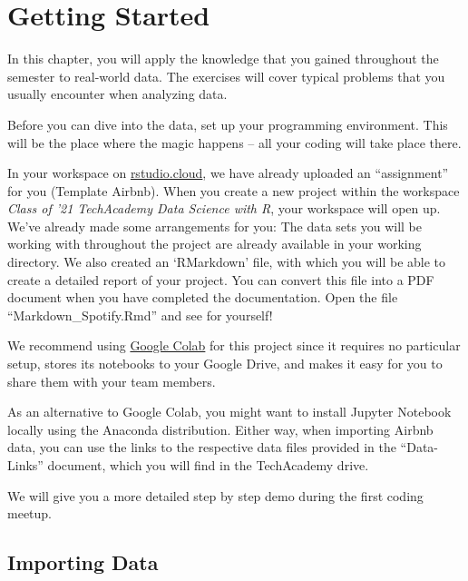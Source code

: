 \documentclass[
  11pt,
]{book}
\newenvironment{tips}[1]
  {
  \begin{itemize}
  \footnotesize
  \renewcommand{\labelitemi}{
    \raisebox{-.7\height}[0pt][0pt]{
      {\setkeys{Gin}{width=3em,keepaspectratio}
        \texttt{[image: images/\#1.png]}}
    }
  }
  \setlength{\fboxsep}{1em}
  \begin{rbox}
  \item
  }
  {
  \end{rbox}
  \end{itemize}
  }
\newenvironment{tipsp}[1]
  {
  \begin{itemize}
  \footnotesize
  \renewcommand{\labelitemi}{
    \raisebox{-.7\height}[0pt][0pt]{
      {\setkeys{Gin}{width=3em,keepaspectratio}
        \texttt{[image: images/\#1.png]}}
    }
  }
  \setlength{\fboxsep}{1em}
  \begin{pbox}
  \item
  }
  {
  \end{pbox}
  \end{itemize}
  }
\begin{document}
\hypertarget{getting-started}{%
\section{Getting Started}\label{getting-started}}

In this chapter, you will apply the knowledge that you gained throughout the semester to real-world data. The exercises will cover typical problems that you usually encounter when analyzing data.

Before you can dive into the data, set up your programming environment. This will be the place where the magic happens -- all your coding will take place there.

\begin{tips}r

In your workspace on \href{https://rstudio.cloud/projects}{rstudio.cloud}, we have already uploaded an ``assignment'' for you (Template Airbnb). When you create a new project within the workspace \emph{Class of '21 \textbar{} TechAcademy \textbar{} Data Science with R}, your workspace will open up. We've already made some arrangements for you: The data sets you will be working with throughout the project are already available in your working directory. We also created an `RMarkdown' file, with which you will be able to create a detailed report of your project. You can convert this file into a PDF document when you have completed the documentation. Open the file ``Markdown\_Spotify.Rmd'' and see for yourself!

\end{tips}

\begin{tipsp}p

We recommend using \href{https://colab.research.google.com}{Google Colab} for this project since it requires no particular setup, stores its notebooks to your Google Drive, and makes it easy for you to share them with your team members.

As an alternative to Google Colab, you might want to install Jupyter Notebook locally using the Anaconda distribution.
Either way, when importing Airbnb data, you can use the links to the respective data files provided in the ``Data-Links'' document, which you will find in the TechAcademy drive.

We will give you a more detailed step by step demo during the first coding meetup.

\end{tipsp}

\hypertarget{importing-data}{%
\subsection{Importing Data}\label{importing-data}}
\end{document}
